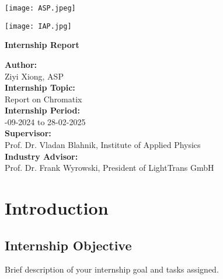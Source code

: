 \documentclass[a4paper,12pt]{report}
\begin{document}
\begin{titlepage}
    \begin{minipage}[t]{0.6\textwidth}
        \texttt{[image: ASP.jpeg]}
    \end{minipage}
    \hfill
    \begin{minipage}[t]{0.4\textwidth}
        \raggedleft
        \texttt{[image: IAP.jpg]}
    \end{minipage}

    \vspace{2cm}

    {\Huge\centering\bfseries Internship Report\\[0.5cm]}
    \vspace{3cm}

    \raggedright
    \large
    \centering\textbf{Author:}\\[0.5cm]
    \centering Ziyi Xiong, ASP\\[0.5cm]
    
    \centering\textbf{Internship Topic:}\\[0.5cm] 
    \centering Report on Chromatix\\[0.5cm]
    
    \centering\textbf{Internship Period:}\\[0.5cm] 
    -09-2024 to 28-02-2025\\[0.5cm]
    
    \centering \textbf{Supervisor:} \\[0.5cm]
    \centering Prof. Dr. Vladan Blahnik, Institute of Applied Physics\\[0.5cm]
    
    \centering\textbf{Industry Advisor:} \\[0.5cm]
    \centering Prof. Dr. Frank Wyrowski, President of LightTrans GmbH\\

    \vfill
\end{titlepage}


\tableofcontents
\newpage

\chapter{Introduction}
\section{Internship Objective}
Brief description of your internship goal and tasks assigned.
\end{document}

